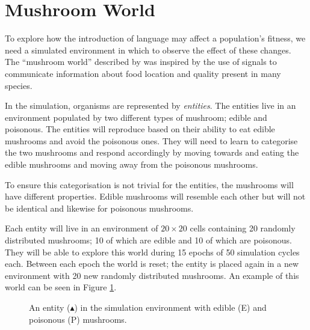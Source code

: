 \documentclass[12pt,a4paper]{report}
\begin{document}
\section{Mushroom World}\label{section:world}

To explore how the introduction of language may affect a population's fitness, we need a simulated environment in which to observe the effect of these changes. The ``mushroom world'' described by \cite{Cangelosi1998} was inspired by the use of signals to communicate information about food location and quality present in many species.

In the simulation, organisms are represented by \emph{entities}. The entities live in an environment populated by two different types of mushroom; edible and poisonous. The entities will reproduce based on their ability to eat edible mushrooms and avoid the poisonous ones. They will need to learn to categorise the two mushrooms and respond accordingly by moving towards and eating the edible mushrooms and moving away from the poisonous mushrooms.

To ensure this categorisation is not trivial for the entities, the mushrooms will have different properties. Edible mushrooms will resemble each other but will not be identical and likewise for poisonous mushrooms.

Each entity will live in an environment of $20 \times 20$ cells containing 20 randomly distributed mushrooms; 10 of which are edible and 10 of which are poisonous. They will be able to explore this world during 15 epochs of 50 simulation cycles each. Between each epoch the world is reset; the entity is placed again in a new environment with 20 new randomly distributed mushrooms. An example of this world can be seen in Figure \ref{fig:environment}.

\begin{figure}[ht]
\centering
{}
\caption{An entity ($\blacktriangle$) in the simulation environment with edible (E) and poisonous (P) mushrooms.}
\label{fig:environment}
\end{figure}
\end{document}

